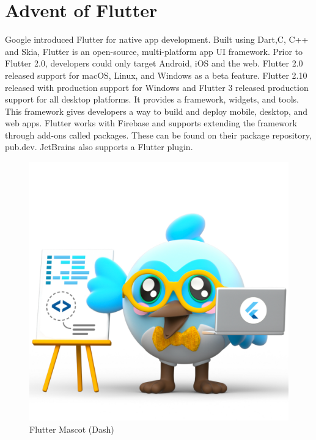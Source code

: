 \section{Advent of Flutter}
Google introduced Flutter for native app development. Built using Dart,C, C++ and Skia, Flutter is an open-source, multi-platform app UI framework. Prior to Flutter 2.0, developers could only target Android, iOS and the web. Flutter 2.0 released support for macOS, Linux, and Windows as a beta feature. Flutter 2.10 released with production support for Windows and Flutter 3 released production support for all desktop platforms. It provides a framework, widgets, and tools. This framework gives developers a way to build and deploy mobile, desktop, and web apps. Flutter works with Firebase and supports extending the framework through add-ons called packages. These can be found on their package repository, pub.dev. JetBrains also supports a Flutter plugin\cite{enwiki:1155641282}.

\begin{figure}[H]
    \centering
    \includegraphics[scale=0.25]{media/dash.jpg}
    \caption{Flutter Mascot (Dash)}
    \label{fig:dash}
\end{figure}
